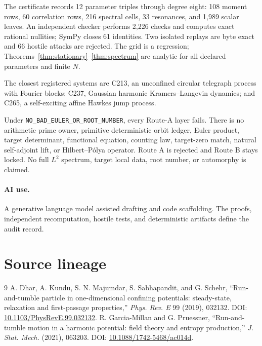 \documentclass[10pt]{article}
\begin{document}
The certificate records 12 parameter triples through degree eight: 108
moment rows, 60 correlation rows, 216 spectral cells, 33 resonances, and
1,989 scalar leaves.  An independent checker performs 2,226 checks and
computes exact rational nullities; SymPy closes 61 identities.  Two isolated
replays are byte exact and 66 hostile attacks are rejected.  The grid is a
regression; Theorems~\ref{thm:stationary}--\ref{thm:spectrum} are analytic
for all declared parameters and finite $N$.

The closest registered systems are C213, an unconfined circular telegraph
process with Fourier blocks; C237, Gaussian harmonic Kramers--Langevin
dynamics; and C265, a self-exciting affine Hawkes jump process.

Under \texttt{NO\_BAD\_EULER\_OR\_ROOT\_NUMBER}, every Route-A layer fails.
There is no arithmetic prime owner, primitive deterministic orbit ledger,
Euler product, target determinant, functional equation, counting law,
target-zero match, natural self-adjoint lift, or Hilbert--P\'olya operator.
Route A is rejected and Route B stays locked.  No full $L^2$ spectrum,
target local data, root number, or automorphy is claimed.

\paragraph{AI use.}
A generative language model assisted drafting and code scaffolding.  The
proofs, independent recomputation, hostile tests, and deterministic
artifacts define the audit record.
\fi

\section*{Source lineage}
\begin{thebibliography}{9}
 A. Dhar, A. Kundu, S. N. Majumdar, S. Sabhapandit, and
G. Schehr, ``Run-and-tumble particle in one-dimensional confining
potentials: steady-state, relaxation and first-passage properties,''
\emph{Phys. Rev. E} 99 (2019), 032132. DOI:
\href{https://doi.org/10.1103/PhysRevE.99.032132}%
{10.1103/PhysRevE.99.032132}.
 R. Garcia-Millan and G. Pruessner,
``Run-and-tumble motion in a harmonic potential: field theory and entropy
production,'' \emph{J. Stat. Mech.} (2021), 063203. DOI:
\href{https://doi.org/10.1088/1742-5468/ac014d}%
{10.1088/1742-5468/ac014d}.
\end{thebibliography}
\end{document}
